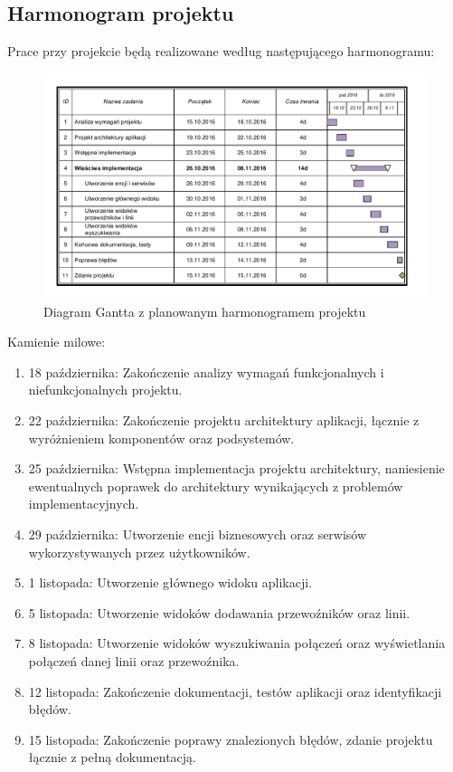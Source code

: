 \documentclass[10pt,a4paper]{article}
\begin{document}
\subsection{Harmonogram projektu}
Prace przy projekcie będą realizowane według następującego harmonogramu:
\begin{figure}[H]
	\centering
	\includegraphics[width=16cm]{gantt.pdf}
	\caption{Diagram Gantta z planowanym harmonogramem projektu}
\end{figure}
Kamienie milowe:
\begin{enumerate}
	\item 18 października: Zakończenie analizy wymagań funkcjonalnych i niefunkcjonalnych projektu.
	\item 22 października: Zakończenie projektu architektury aplikacji, łącznie z wyróżnieniem komponentów oraz podsystemów.
	\item 25 października: Wstępna implementacja projektu architektury, naniesienie ewentualnych poprawek do architektury wynikających z problemów implementacyjnych.
	\item 29 października: Utworzenie encji biznesowych oraz serwisów wykorzystywanych przez użytkowników.
	\item 1 listopada: Utworzenie głównego widoku aplikacji.
	\item 5 listopada: Utworzenie widoków dodawania przewoźników oraz linii.
	\item 8 listopada: Utworzenie widoków wyszukiwania połączeń oraz wyświetlania połączeń danej linii oraz przewoźnika.
	\item 12 listopada: Zakończenie dokumentacji, testów aplikacji oraz identyfikacji błędów.
	\item 15 listopada: Zakończenie poprawy znalezionych błędów, zdanie projektu łącznie z pełną dokumentacją.
\end{enumerate}
\end{document}
